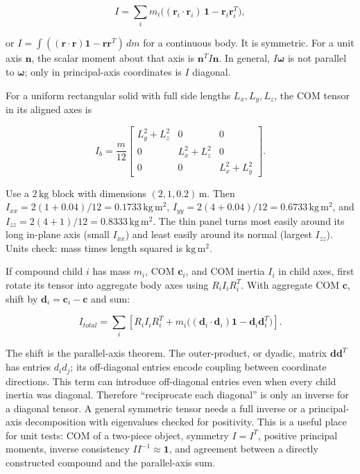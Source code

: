 \[
I=\sum_i m_i\big((\mathbf r_i\cdot\mathbf r_i)\,\mathbf 1-\mathbf r_i\mathbf r_i^T\big),
\]

or \(I=\int((\mathbf r\cdot\mathbf r)\mathbf 1-\mathbf r\mathbf r^T)\,dm\) for a continuous body. It is symmetric. For a unit axis \(\mathbf n\), the scalar moment about that axis is \(\mathbf n^T I\mathbf n\). In general, \(I\boldsymbol\omega\) is not parallel to \(\boldsymbol\omega\); only in principal-axis coordinates is \(I\) diagonal.

For a uniform rectangular solid with full side lengths \(L_x,L_y,L_z\), the COM tensor in its aligned axes is

\[
I_b=\frac{m}{12}\begin{bmatrix}L_y^2+L_z^2&0&0\\0&L_x^2+L_z^2&0\\0&0&L_x^2+L_y^2\end{bmatrix}.
\]

Use a \(2\,\mathrm{kg}\) block with dimensions \((2,1,0.2)\,\mathrm m\). Then \(I_{xx}=2(1+0.04)/12=0.1733\,\mathrm{kg\,m^2}\), \(I_{yy}=2(4+0.04)/12=0.6733\,\mathrm{kg\,m^2}\), and \(I_{zz}=2(4+1)/12=0.8333\,\mathrm{kg\,m^2}\). The thin panel turns most easily around its long in-plane axis (small \(I_{xx}\)) and least easily around its normal (largest \(I_{zz}\)). Units check: mass times length squared is \(\mathrm{kg\,m^2}\).

If compound child \(i\) has mass \(m_i\), COM \(\mathbf c_i\), and COM inertia \(I_i\) in child axes, first rotate its tensor into aggregate body axes using \(R_iI_iR_i^T\). With aggregate COM \(\mathbf c\), shift by \(\mathbf d_i=\mathbf c_i-\mathbf c\) and sum:

\[
I_{total}=\sum_i\left[R_iI_iR_i^T+m_i\big((\mathbf d_i\cdot\mathbf d_i)\mathbf 1-\mathbf d_i\mathbf d_i^T\big)\right].
\]

The shift is the parallel-axis theorem. The outer-product, or dyadic, matrix \(\mathbf d\mathbf d^T\) has entries \(d_i d_j\); its off-diagonal entries encode coupling between coordinate directions. This term can introduce off-diagonal entries even when every child inertia was diagonal. Therefore ``reciprocate each diagonal'' is only an inverse for a diagonal tensor. A general symmetric tensor needs a full inverse or a principal-axis decomposition with eigenvalues checked for positivity. This is a useful place for unit tests: COM of a two-piece object, symmetry \(I=I^T\), positive principal moments, inverse consistency \(II^{-1}\approx\mathbf1\), and agreement between a directly constructed compound and the parallel-axis sum.

